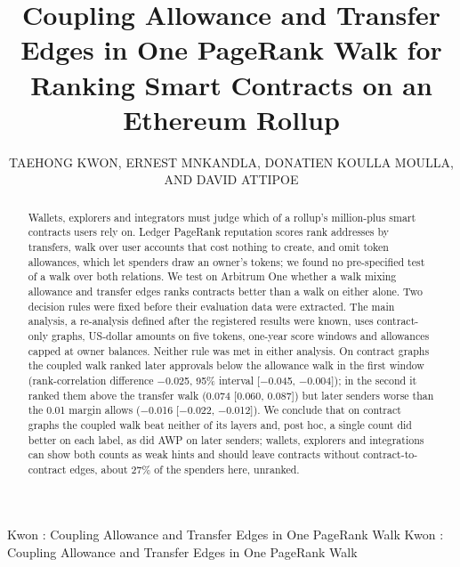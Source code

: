 \documentclass{ieeeaccess}
\begin{document}

\title{Coupling Allowance and Transfer Edges in One PageRank Walk for Ranking Smart Contracts on an Ethereum Rollup}
\author{\uppercase{Taehong Kwon},
\uppercase{Ernest Mnkandla},
\uppercase{Donatien Koulla Moulla}, AND
\uppercase{David Attipoe}}

\address[1]{School of Computing, College of Science, Engineering and Technology, University of South Africa, Johannesburg, South Africa (e-mail: thkwon@enu-tech.co.kr)}
\address[2]{Centre for Augmented Intelligence and Data Science (CAIDS), School of Computing, University of South Africa, Johannesburg, South Africa}

\markboth
{Kwon \headeretal: Coupling Allowance and Transfer Edges in One PageRank Walk}
{Kwon \headeretal: Coupling Allowance and Transfer Edges in One PageRank Walk}


\begin{abstract}
Wallets, explorers and integrators must judge which of a rollup's million-plus smart contracts users rely on. Ledger PageRank reputation scores rank addresses by transfers, walk over user accounts that cost nothing to create, and omit token allowances, which let spenders draw an owner's tokens; we found no pre-specified test of a walk over both relations. We test on Arbitrum One whether a walk mixing allowance and transfer edges ranks contracts better than a walk on either alone. Two decision rules were fixed before their evaluation data were extracted. The main analysis, a re-analysis defined after the registered results were known, uses contract-only graphs, US-dollar amounts on five tokens, one-year score windows and allowances capped at owner balances. Neither rule was met in either analysis. On contract graphs the coupled walk ranked later approvals below the allowance walk in the first window (rank-correlation difference $-$0.025, 95\% interval [$-$0.045, $-$0.004]); in the second it ranked them above the transfer walk (0.074 [0.060, 0.087]) but later senders worse than the 0.01 margin allows ($-$0.016 [$-$0.022, $-$0.012]). We conclude that on contract graphs the coupled walk beat neither of its layers and, post hoc, a single count did better on each label, as did AWP on later senders; wallets, explorers and integrations can show both counts as weak hints and should leave contracts without contract-to-contract edges, about 27\% of the spenders here, unranked.
\end{abstract}
\end{document}
